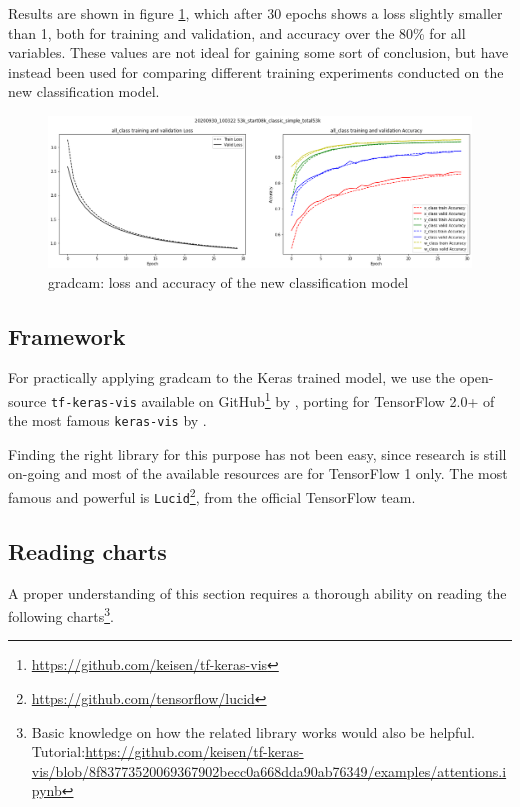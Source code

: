 Results are shown in figure \ref{fig:gradcam-retrain-simple}, which after 30 epochs shows a loss slightly smaller than 1, both for training and validation, and accuracy over the 80\% for all variables. These values are not ideal for gaining some sort of conclusion, but have instead been used for comparing different training experiments conducted on the new classification model.

\begin{figure}[!h]
	\centering
	\includegraphics[width=1\textwidth]{"contents/images/04-metrics-class-simple"}
	\caption[\gls{gradcam}: loss and accuracy of the new classification model]{\gls{gradcam}: loss and accuracy of the new classification model}
	\label{fig:gradcam-retrain-simple}
\end{figure}



\subsection{Framework}
\label{subsec:gradcam-framework}

For practically applying \gls{gradcam} to the Keras trained model, we use the open-source \texttt{tf-keras-vis} available on GitHub\footnote{\url{https://github.com/keisen/tf-keras-vis}} by \cite{tf-keras-vis}, porting for TensorFlow 2.0+ of the most famous \texttt{keras-vis} by \cite{keras-vis}.

Finding the right library for this purpose has not been easy, since research is still on-going and most of the available resources are for TensorFlow 1 only. The most famous and powerful is \texttt{Lucid}\footnote{\url{https://github.com/tensorflow/lucid}}, from the official TensorFlow team.


\subsection{Reading charts}
\label{subsec:gradcam-reading}

A proper understanding of this section requires a thorough ability on reading the following charts\footnote{Basic knowledge on how the related library works would also be helpful. Tutorial:\url{https://github.com/keisen/tf-keras-vis/blob/8f83773520069367902becc0a668dda90ab76349/examples/attentions.ipynb}}.


